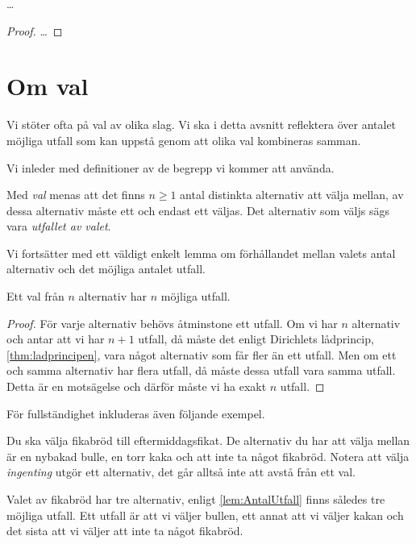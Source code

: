 \begin{theorem}
\label{thm:ladprincipen}
  \dots
\end{theorem}
\begin{proof}
  \dots
\end{proof}


\section{Om val}
Vi stöter ofta på val av olika slag.
Vi ska i detta avsnitt reflektera över antalet möjliga utfall som kan uppstå
genom att olika val kombineras samman.

Vi inleder med definitioner av de begrepp vi kommer att använda.

\begin{definition}\label{def:Val}
  Med \emph{val} menas att det finns \(n \geq 1\) antal distinkta alternativ
  att välja mellan, av dessa alternativ måste ett och endast ett väljas.
  Det alternativ som väljs sägs vara \emph{utfallet av valet}.
\end{definition}

Vi fortsätter med ett väldigt enkelt lemma om förhållandet mellan valets
antal alternativ och det möjliga antalet utfall.

\begin{lemma}\label{lem:AntalUtfall}
  Ett val från \(n\) alternativ har \(n\) möjliga utfall.
\end{lemma}
\begin{proof}
  För varje alternativ behövs åtminstone ett utfall.
  Om vi har \(n\) alternativ och antar att vi har \(n+1\) utfall,
  då måste det enligt Dirichlets lådprincip, \cref{thm:ladprincipen}, vara 
  något alternativ som får fler än ett utfall.
  Men om ett och samma alternativ har flera utfall, då måste dessa utfall
  vara samma utfall.
  Detta är en motsägelse och därför måste vi ha exakt \(n\) utfall.
\end{proof}

För fullständighet inkluderas även följande exempel.
\begin{example}\label{ex:Fikabrod}
  Du ska välja fikabröd till eftermiddagsfikat.
  De alternativ du har att välja mellan är en nybakad bulle, en torr kaka och
  att inte ta något fikabröd.
  Notera att välja \emph{ingenting} utgör ett alternativ, det går alltså inte
  att avstå från ett val.

  Valet av fikabröd har tre alternativ, enligt \cref{lem:AntalUtfall}
  finns således tre möjliga utfall.
  Ett utfall är att vi väljer bullen, ett annat att vi väljer kakan och det
  sista att vi väljer att inte ta något fikabröd.
\end{example}

